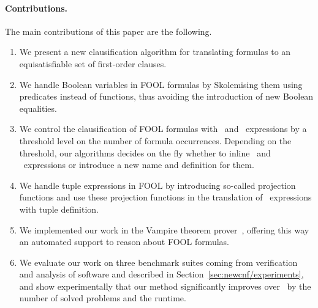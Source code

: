 
\paragraph{Contributions.} The main contributions of this paper are the following.
\begin{enumerate}
  \item We present a new clausification algorithm for translating \folb{} formulas to an equisatisfiable set of first-order clauses. 
  \item We handle Boolean variables in FOOL formulas by Skolemising them using \Skolem{} predicates instead of \Skolem{} functions, thus avoiding the introduction of new Boolean equalities. 
  \item We control the clausification of FOOL formulas with \ITE\ and \LETIN\ expressions by a threshold level on the number of formula occurrences. Depending on the threshold, our algorithms decides on the fly whether to inline \ITE\ and \LETIN\ expressions or introduce a new name and definition for them. 
\item We handle tuple expressions in FOOL by introducing so-called projection functions  and use these projection functions in the translation of \LETIN\ expressions with tuple definition. 
  \item We implemented our work in the Vampire theorem prover~\cite{Vampire13}, 
  offering this way an automated support to reason about FOOL formulas. 
  \item We evaluate our work on three benchmark suites coming from verification
    and analysis of software and described in
    Section~\ref{sec:newcnf/experiments}, and show experimentally that our method
    significantly improves over~\cite{VampireAndFOOL} by the number of solved problems and the runtime.
\end{enumerate}